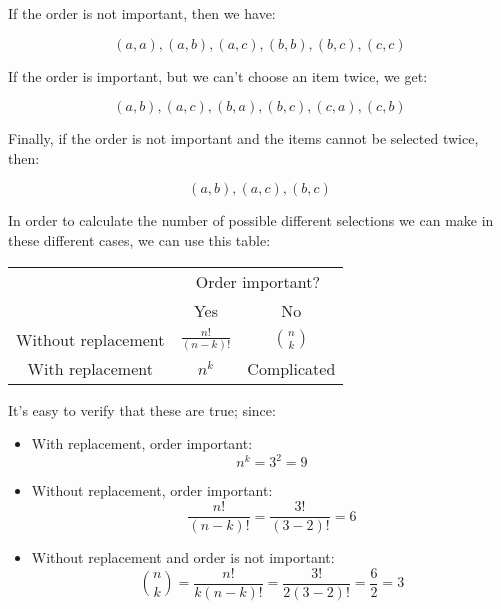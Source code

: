 \documentclass{article}
\begin{document}
If the order is not important, then we have:

\[
	(a,a), (a,b), (a,c), (b,b), (b,c), (c,c)
\]

If the order is important, but we can't choose an item twice, we get:

\[
	(a,b), (a,c), (b,a), (b,c), (c,a), (c,b)
\]

Finally, if the order is not important and the items cannot be selected twice,
then:

\[
	(a,b), (a,c), (b,c)
\]

In order to calculate the number of possible different selections we can make in
these different cases, we can use this table:

\begin{center}
\begin{tabular}{|c|c|c|}
	\hline
	& \multicolumn{2}{c|}{Order important?}\\
	\cline{2-3}
	& Yes & No\\ \hline
	Without replacement & $\frac{n!}{(n-k)!}$ & $n \choose k$\\ \hline
	With replacement & $n^k$ & Complicated\\ \hline
\end{tabular}
\end{center}

It's easy to verify that these are true; since:

\begin{itemize}
	\item With replacement, order important:
	\[
		n^k = 3^2 = 9
	\]
	\item Without replacement, order important:
	\[
		\frac{n!}{(n - k)!} = 	\frac{3!}{(3 - 2)!} = 6
	\]
	\item Without replacement and order is not important:
	\[
		{n \choose k} = \frac{n!}{k(n - k)!} = \frac{3!}{2(3 - 2)!} = \frac{6}{2} = 3
	\]

\end{itemize}

\end{document}
